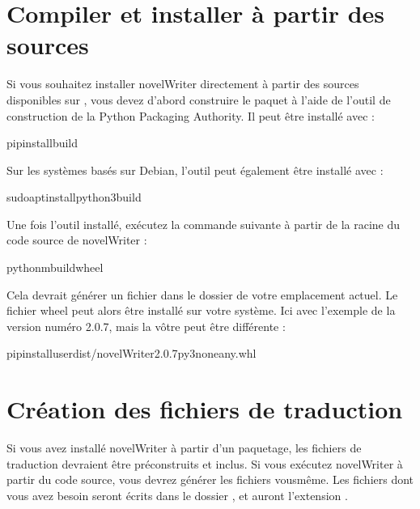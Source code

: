 \documentclass[a4paper,11pt,french]{sphinxmanual}
\begin{document}
\section{Compiler et installer à partir des sources}
\label{\detokenize{tech_source:build-and-install-from-source}}\label{\detokenize{tech_source:a-source-install}}
\sphinxAtStartPar
Si vous souhaitez installer novelWriter directement à partir des sources disponibles sur , vous devez d’abord construire le paquet à l’aide de l’outil de construction de la Python Packaging Authority. Il peut être installé avec :

\begin{sphinxVerbatim}[commandchars=\\\{\}]
pipinstallbuild
\end{sphinxVerbatim}

\sphinxAtStartPar
Sur les systèmes basés sur Debian, l’outil peut également être installé avec :

\begin{sphinxVerbatim}[commandchars=\\\{\}]
sudoaptinstallpython3\PYGZhy{}build
\end{sphinxVerbatim}

\sphinxAtStartPar
Une fois l’outil installé, exécutez la commande suivante à partir de la racine du code source de novelWriter :

\begin{sphinxVerbatim}[commandchars=\\\{\}]
python\PYGZhy{}mbuild\PYGZhy{}\PYGZhy{}wheel
\end{sphinxVerbatim}

\sphinxAtStartPar
Cela devrait générer un fichier  dans le dossier  de votre emplacement actuel. Le fichier wheel peut alors être installé sur votre système. Ici avec l’exemple de la version numéro 2.0.7, mais la vôtre peut être différente :

\begin{sphinxVerbatim}[commandchars=\\\{\}]
pipinstall\PYGZhy{}\PYGZhy{}userdist/novelWriter\PYGZhy{}2.0.7\PYGZhy{}py3\PYGZhy{}none\PYGZhy{}any.whl
\end{sphinxVerbatim}


\section{Création des fichiers de traduction}
\label{\detokenize{tech_source:building-the-translation-files}}\label{\detokenize{tech_source:a-source-i18n}}
\sphinxAtStartPar
Si vous avez installé novelWriter à partir d’un paquetage, les fichiers de traduction devraient être préconstruits et inclus. Si vous exécutez novelWriter à partir du code source, vous devrez générer les fichiers vous\sphinxhyphen{}même. Les fichiers dont vous avez besoin seront écrits dans le dossier , et auront l’extension .
\end{document}
